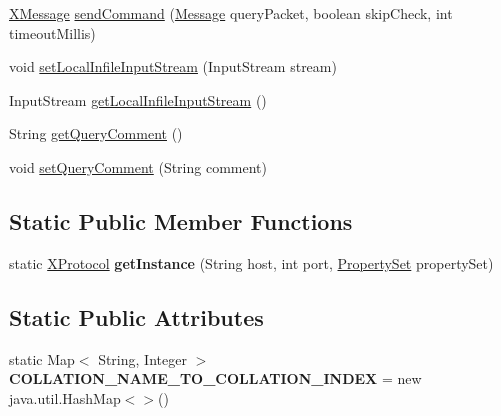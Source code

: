 \begin{DoxyCompactItemize}
\item 
\mbox{\hyperlink{classcom_1_1mysql_1_1cj_1_1protocol_1_1x_1_1_x_message}{X\+Message}} \mbox{\hyperlink{classcom_1_1mysql_1_1cj_1_1protocol_1_1x_1_1_x_protocol_a0ecabba038f9c769909e05a53d6c9657}{send\+Command}} (\mbox{\hyperlink{interfacecom_1_1mysql_1_1cj_1_1protocol_1_1_message}{Message}} query\+Packet, boolean skip\+Check, int timeout\+Millis)
\item 
void \mbox{\hyperlink{classcom_1_1mysql_1_1cj_1_1protocol_1_1x_1_1_x_protocol_a4f539adc72747ef03c94bc92acde5efb}{set\+Local\+Infile\+Input\+Stream}} (Input\+Stream stream)
\item 
Input\+Stream \mbox{\hyperlink{classcom_1_1mysql_1_1cj_1_1protocol_1_1x_1_1_x_protocol_a5a291c17d84fa71984b3a65ecbb91315}{get\+Local\+Infile\+Input\+Stream}} ()
\item 
String \mbox{\hyperlink{classcom_1_1mysql_1_1cj_1_1protocol_1_1x_1_1_x_protocol_aa6abdec32fdb1e18c44c33b831b40e20}{get\+Query\+Comment}} ()
\item 
void \mbox{\hyperlink{classcom_1_1mysql_1_1cj_1_1protocol_1_1x_1_1_x_protocol_ab009a2b06f09d53869c8983bed6c96b8}{set\+Query\+Comment}} (String comment)
\end{DoxyCompactItemize}
\subsection*{Static Public Member Functions}
\begin{DoxyCompactItemize}
\item 
\mbox{\label{classcom_1_1mysql_1_1cj_1_1protocol_1_1x_1_1_x_protocol_a2b7349e168c6829310967e57f69a55b0}} 
static \mbox{\hyperlink{classcom_1_1mysql_1_1cj_1_1protocol_1_1x_1_1_x_protocol}{X\+Protocol}} {\bfseries get\+Instance} (String host, int port, \mbox{\hyperlink{interfacecom_1_1mysql_1_1cj_1_1conf_1_1_property_set}{Property\+Set}} property\+Set)
\end{DoxyCompactItemize}
\subsection*{Static Public Attributes}
\begin{DoxyCompactItemize}
\item 
\mbox{\label{classcom_1_1mysql_1_1cj_1_1protocol_1_1x_1_1_x_protocol_a641b0957f0f852d23d88c15b4b1539e2}} 
static Map$<$ String, Integer $>$ {\bfseries C\+O\+L\+L\+A\+T\+I\+O\+N\+\_\+\+N\+A\+M\+E\+\_\+\+T\+O\+\_\+\+C\+O\+L\+L\+A\+T\+I\+O\+N\+\_\+\+I\+N\+D\+EX} = new java.\+util.\+Hash\+Map$<$$>$()
\end{DoxyCompactItemize}
